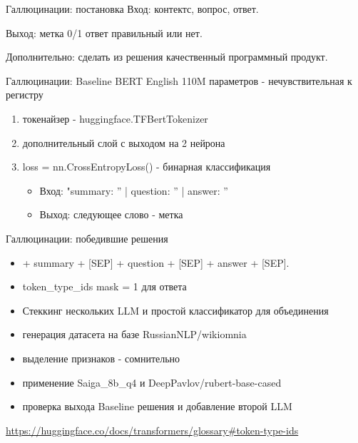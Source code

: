 \documentclass[presentation]{beamer}
\begin{document}
\begin{frame}[label={sec:orge2df45b}]{Галлюцинации: постановка}
Вход: контектс, вопрос, ответ.

Выход: метка 0/1 ответ правильный или нет.

Дополнительно: сделать из решения качественный программный продукт.
\end{frame}
\begin{frame}[label={sec:org611ffe9}]{Галлюцинации: Baseline}
BERT English 110M параметров - нечувствительная к регистру
\begin{enumerate}
\item токенайзер - huggingface.TFBertTokenizer
\item дополнительный слой с выходом на 2 нейрона
\item loss = nn.CrossEntropyLoss() - бинарная классификация
\begin{itemize}
\item Вход: "summary: '' | question: '' | answer: ''
\item Выход: следующее слово - метка
\end{itemize}
\end{enumerate}
\end{frame}
\begin{frame}[label={sec:org4220894}]{Галлюцинации: победившие решения}
\begin{itemize}
\item\relax [CLS] + summary + [SEP] + question + [SEP] + answer + [SEP].
\item token\_type\_ids mask = 1 для ответа
\item Стеккинг нескольких LLM и простой классификатор для объединения
\item генерация датасета на базе RussianNLP/wikiomnia
\item выделение признаков - сомнительно
\item применение Saiga\_8b\_q4 и DeepPavlov/rubert-base-cased
\item проверка выхода Baseline решения и добавление второй LLM
\end{itemize}









\url{https://huggingface.co/docs/transformers/glossary\#token-type-ids}
\end{frame}
\end{document}

